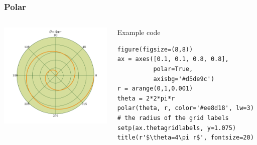\documentclass[14pt,compress]{beamer}
\begin{document}
\begin{frame}[fragile] \frametitle{Polar}
  \begin{columns}
    \hspace*{-0.5in}
  \includegraphics[height=2in, interpolate=true]{data/polar}  
    \begin{block}{Example code}
    \tiny
\begin{lstlisting}
figure(figsize=(8,8))
ax = axes([0.1, 0.1, 0.8, 0.8], 
          polar=True, 
          axisbg='#d5de9c')
r = arange(0,1,0.001)
theta = 2*2*pi*r
polar(theta, r, color='#ee8d18', lw=3)
# the radius of the grid labels
setp(ax.thetagridlabels, y=1.075) 
title(r'$\theta=4\pi r$', fontsize=20)
\end{lstlisting}

  \end{block}
\end{columns}
\end{frame}
\end{document}
